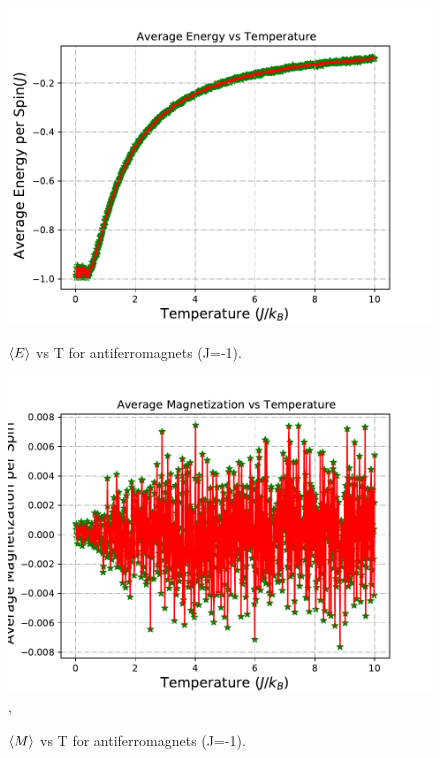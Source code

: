 \documentclass[12pt]{article}
\begin{document}
	\begin{figure}[H]
		\begin{minipage}[t]{0.5\textwidth}
			\centering
			\includegraphics[scale=0.5]{ave E vs T (Low, J=-1).pdf}
			\setcaptionwidth{3in}
			\caption{$\braket{E}$ vs T for  antiferromagnets (J=-1). }
			\label{fig: low start average energy for antiferromagnet}
		\end{minipage}
		\begin{minipage}[t]{0.5\textwidth}
			\centering
			\includegraphics[scale=0.5]{ave M vs T (Low, J=-1).pdf}, 
			\setcaptionwidth{3in}
			\caption{$\braket{M}$ vs T for  antiferromagnets (J=-1).}
			\label{fig: low start average magnetization for antiferromagnet}
		\end{minipage}
	\end{figure}
	
\end{document}
